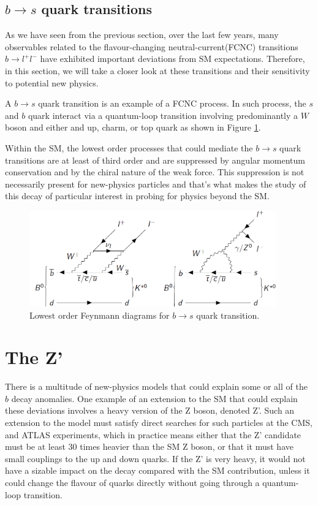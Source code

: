 \subsection{$b\rightarrow s$ quark transitions}
As we have seen from the previous section, over the last few years, many observables related to the flavour-changing neutral-current(FCNC) transitions $b\rightarrow l^{+}l^{-}$ have exhibited important deviations from SM expectations. Therefore, in this section, we will take a closer look at these transitions and their sensitivity to potential new physics.

A $b\rightarrow s$ quark transition is an example of a FCNC process\cite{NatFCNC}. In such process, the $s$ and $b$ quark interact via a quantum-loop transition involving predominantly a $W$ boson and either and up, charm, or top quark as shown in Figure \ref{fig:bmesonpic}.

Within the SM, the lowest order processes that could mediate the $b\rightarrow s$ quark transitions are at least of third order and are suppressed by angular momentum conservation and by the chiral nature of the weak force. This suppression is not necessarily present for new-physics particles and that's what makes the study of this decay of particular interest in probing for physics beyond the SM.

 \begin{figure}[H]
 	\centering
 	\includegraphics[width=0.95\textwidth]{figures/bmeson.png}
 	\singlespace
 	\caption{Lowest order Feynmann diagrams for $b\rightarrow s$ quark transition.}
 	\label{fig:bmesonpic}
 \end{figure}

\section{The Z'}
There is a multitude of new-physics models that could explain some or all of the $b$ decay anomalies. One example of an extension to the SM that could explain these deviations involves a heavy version of the Z boson, denoted Z'\cite{Buras:2013}. Such an extension to the model must satisfy direct searches for such particles at the CMS\cite{201757}, \cite{Sirunyan:2018exx} and ATLAS \cite{ATLAS-CONF-2016-045} experiments, which in practice means either that the Z' candidate must be at least 30 times heavier than the SM Z boson, or that it must have small couplings to the up and down quarks. If the Z' is very heavy, it would not have a sizable impact on the decay compared with the SM contribution, unless it could change the flavour of quarks directly without going through a quantum-loop transition.

